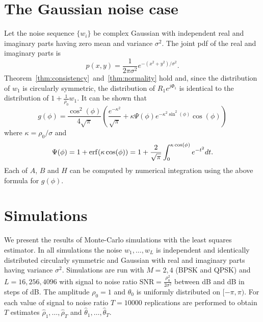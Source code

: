\documentclass{article}
\begin{document}
\section{The Gaussian noise case}\label{sec:gaussian-noise-case}

Let the noise sequence $\{w_i\}$ be complex Gaussian with independent real and imaginary parts having zero mean and variance $\sigma^2$.  The joint pdf of the real and imaginary parts is
\[
p(x,y) = \frac{1}{2\pi\sigma^2}e^{-(x^2 + y^2)/\sigma^2}.
\]
Theorem~\ref{thm:consistency}~and~\ref{thm:normality} hold and, since the distribution of $w_1$ is circularly symmetric, the distribution of $R_1e^{j\Phi_1}$ is identical to the distribution of $1 + \frac{1}{\rho_0} w_1$.
It can be shown that
\[
g(\phi) = \frac{\cos^2(\phi)}{4\sqrt{\pi}}\left( \frac{e^{-\kappa^2} }{\sqrt{\pi}} + \kappa \Psi(\phi)  e^{-\kappa^2\sin^2(\phi)}\cos(\phi) \right)
\]
where $\kappa = \rho_0/\sigma$ and
\vspace{-0.1cm}
\[
\Psi(\phi) = 1 + \operatorname{erf}(\kappa \cos(\phi)) = 1 + \frac{2}{\sqrt{\pi}}\int_0^{\kappa \cos(\phi)} e^{-t^2} dt.
\]
Each of $A$, $B$ and $H$ can be computed by numerical integration using the above formula for $g(\phi)$.


\section{Simulations}\label{sec:simulations}

We present the results of Monte-Carlo simulations with the least squares estimator.  In all simulations the noise $w_1,\dots,w_L$ is independent and identically distributed circularly symmetric and Gaussian with real and imaginary parts having variance $\sigma^2$.  Simulations are run with $M=2,4$ (BPSK and QPSK) and $L=16,256,4096$ with signal to noise ratio $\text{SNR} = \tfrac{\rho_0^2}{2\sigma^2}$ between \unit[-20]{dB} and \unit[20]{dB} in steps of \unit[1]{dB}.  The amplitude $\rho_0=1$ and $\theta_0$ is uniformly distributed on $[-\pi, \pi)$.  For each value of signal to noise ratio $T = 10000$ replications are performed to obtain $T$ estimates $\hat{\rho}_1, \dots, \hat{\rho}_T$ and $\hat{\theta}_1, \dots, \hat{\theta}_T$.  
\end{document}
